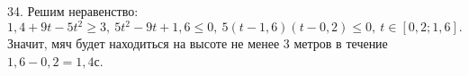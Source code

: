34. Решим неравенство: $1,4+9t-5t^2\geqslant3,\ 5t^2-9t+1,6\leqslant0,\ 5(t-1,6)(t-0,2)\leqslant0,\ t\in[0,2;1,6].$ Значит, мяч будет находиться на высоте не менее 3 метров в течение $1,6-0,2=1,4$с.\\
